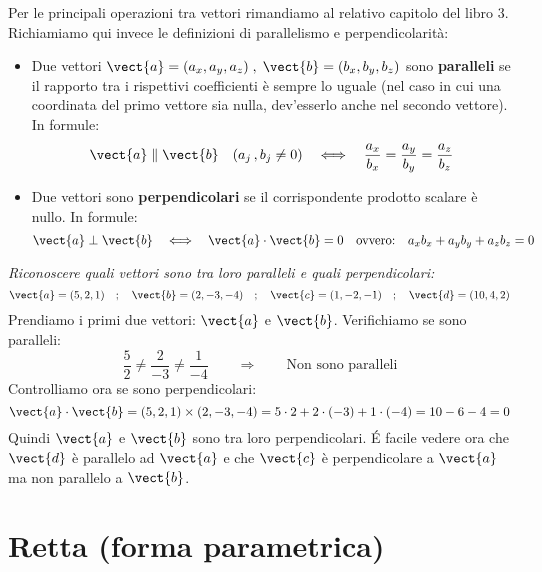 Per le principali operazioni tra vettori rimandiamo al relativo capitolo del libro 3. Richiamiamo qui invece le definizioni di parallelismo e perpendicolarità:
\begin{itemize}
 \item Due vettori \( \vect{a} = (a_x,a_y,a_z) \;,\; \vect{b} = (b_x,b_y,b_z)\) sono \textbf{paralleli} se il rapporto tra i rispettivi coefficienti è sempre lo uguale (nel caso in cui una coordinata del primo vettore sia nulla, dev'esserlo anche nel secondo vettore). In formule:
\[\vect{a} \parallel \vect{b} \quad (a_j\,, b_j \neq 0) \quad \Longleftrightarrow \quad \frac{a_x}{b_x} = \frac{a_y}{b_y} = \frac{a_z}{b_z}\]
\item Due vettori sono \textbf{perpendicolari} se il corrispondente prodotto scalare è nullo. In formule:
\[ \vect{a} \perp \vect{b} \quad \Longleftrightarrow\quad \vect{a} \cdot \vect{b} = 0 \quad \text{ovvero:} \quad a_xb_x+a_yb_y+a_zb_z=0\]
\end{itemize}
\begin{esempio}
 \emph{Riconoscere quali vettori sono tra loro paralleli e quali perpendicolari:}
 \[\vect{a} = (5,2,1) \quad;\quad \vect{b} = (2,-3,-4) \quad;\quad \vect{c} = (1,-2,-1)  \quad;\quad \vect{d} = (10,4,2)\]
 Prendiamo i primi due vettori: \(\vect{a}\) e \(\vect{b}\). Verifichiamo se sono paralleli:
 \[\frac{5}{2} \neq \frac{2}{-3} \neq \frac{1}{-4} \qquad \Rightarrow \qquad \text{Non sono paralleli}\]
 Controlliamo ora se sono perpendicolari:
 \[\vect{a} \cdot \vect{b} = (5,2,1)\times (2,-3,-4) = 5\cdot 2+2\cdot (-3)+1 \cdot (-4) = 10-6-4=0\]
 Quindi \(\vect{a}\) e \(\vect{b}\) sono tra loro perpendicolari. \'E facile vedere ora che \(\vect{d}\) è parallelo ad \(\vect{a}\) e che \(\vect{c}\) è perpendicolare a \(\vect{a}\) ma non parallelo a \(\vect{b}\).
\end{esempio}


\section{Retta (forma parametrica)}


